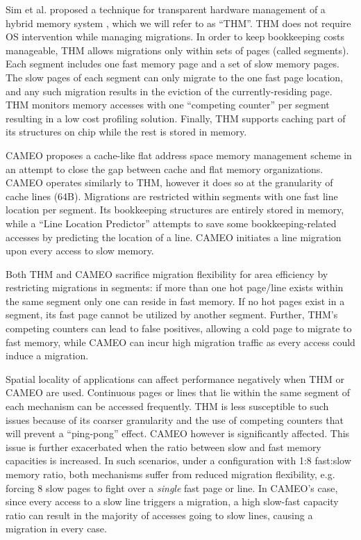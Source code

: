 Sim et al. proposed a technique for transparent hardware management of a hybrid memory system \cite{sim-micro2014}, which we will refer to as ``THM''.
THM does not require OS intervention while managing migrations. In order to keep bookkeeping costs manageable, THM allows migrations only within sets of pages (called segments). Each segment includes one fast memory page and a set of slow memory pages. The slow pages of each segment can only migrate to the one fast page location, and any such migration results in the eviction of the currently-residing page. THM monitors memory accesses with one ``competing counter'' per segment resulting in a low cost profiling solution. Finally, THM supports caching part of its structures on chip while the rest is stored in memory.

CAMEO \cite{cameo} proposes a cache-like flat address space memory management scheme in an attempt to close the gap between cache and flat memory organizations. CAMEO operates similarly to THM, however it does so at the granularity of cache lines (64B). Migrations are restricted within segments with one fast line location per segment. Its bookkeeping structures are entirely stored in memory, while a ``Line Location Predictor'' attempts to save some bookkeeping-related accesses by predicting the location of a line. CAMEO initiates a line migration upon every access to slow memory.

Both THM and CAMEO sacrifice migration flexibility for area efficiency by restricting migrations in segments: if more than one hot page/line exists within the same segment only one can reside in fast memory. If no hot pages exist in a segment, its fast page cannot be utilized by another segment. Further, THM's competing counters can lead to false positives, allowing a cold page to migrate to fast memory, while CAMEO can incur high migration traffic as every access could induce a migration. 

Spatial locality of applications can affect performance negatively when THM or CAMEO are used. Continuous pages or lines that lie within the same segment of each mechanism can be accessed frequently. THM is less susceptible to such issues because of its coarser granularity and the use of competing counters that will prevent a ``ping-pong'' effect. CAMEO however is significantly affected. This issue is further exacerbated when the ratio between slow and fast memory capacities is increased. In such scenarios, under a configuration with 1:8 fast:slow memory ratio, both mechanisms suffer from reduced migration flexibility,
e.g. forcing 8 slow pages to fight over a {\em single} fast page or
line.  In CAMEO's case, since every access to a slow line triggers a migration,
a high slow-fast capacity ratio can result in the majority of accesses going
to slow lines, causing a migration in every case.

